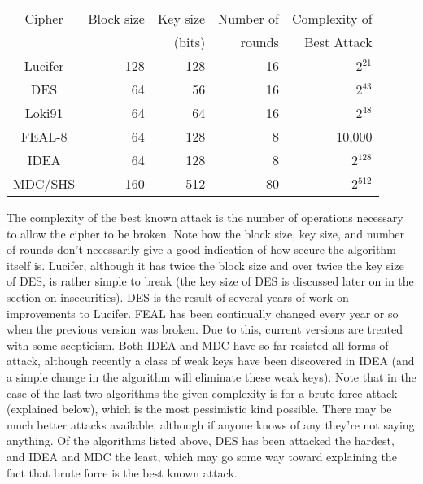 \begin{center}
\begin{tabular}{|c|r|r|r|r|}
\hline
Cipher & Block size & Key size & Number of & Complexity of\\
       &            &  (bits)  &   rounds  &  Best Attack\\
\hline
Lucifer&    128     &    128   &     16    &     2$^{21}$\\
DES    &     64     &     56   &     16    &     2$^{43}$\\
Loki91 &     64     &     64   &     16    &     2$^{48}$\\
FEAL-8 &     64     &    128   &      8    &    10,000\\
IDEA   &     64     &    128   &      8    &     2$^{128}$\\
MDC/SHS&    160     &    512   &     80    &     2$^{512}$\\
\hline
\end{tabular}
\end{center}

The complexity of the best known attack is the number of operations necessary
to allow the cipher to be broken.  Note how the block size, key size, and
number of rounds don't necessarily give a good indication of how secure the
algorithm itself is.  Lucifer, although it has twice the block size and over
twice the key size of DES, is rather simple to break (the key size of DES is
discussed later on in the section on insecurities).  DES is the result of
several years of work on improvements to Lucifer.  FEAL has been continually 
changed every year or so when the previous version was broken.  Due to this, 
current versions are treated with some scepticism.  Both IDEA and MDC have so 
far resisted all forms of attack, although recently a class of weak keys have been
discovered in IDEA (and a simple change in the algorithm will eliminate these
weak keys).  Note that in the case of the last two algorithms the given
complexity is for a brute-force attack (explained below), which is the most
pessimistic kind possible.  There may be much better attacks available,
although if anyone knows of any they're not saying anything.  Of the algorithms
listed above, DES has been attacked the hardest, and IDEA and MDC the least,
which may go some way toward explaining the fact that brute force is the best 
known attack.

